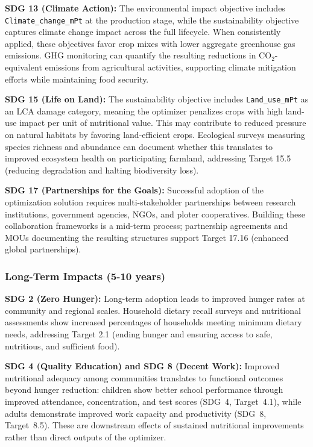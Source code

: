 \documentclass{oqireport}
\begin{document}
\textbf{SDG 13 (Climate Action):} The environmental impact objective includes \texttt{Climate\_change\_mPt} at the production stage, while the sustainability objective captures climate change impact across the full lifecycle. When consistently applied, these objectives favor crop mixes with lower aggregate greenhouse gas emissions. GHG monitoring can quantify the resulting reductions in CO$_2$-equivalent emissions from agricultural activities, supporting climate mitigation efforts while maintaining food security.

\textbf{SDG 15 (Life on Land):} The sustainability objective includes \texttt{Land\_use\_mPt} as an LCA damage category, meaning the optimizer penalizes crops with high land-use impact per unit of nutritional value. This may contribute to reduced pressure on natural habitats by favoring land-efficient crops. Ecological surveys measuring species richness and abundance can document whether this translates to improved ecosystem health on participating farmland, addressing Target 15.5 (reducing degradation and halting biodiversity loss).

\textbf{SDG 17 (Partnerships for the Goals):} Successful adoption of the optimization solution requires multi-stakeholder partnerships between research institutions, government agencies, NGOs, and ploter cooperatives. Building these collaboration frameworks is a mid-term process; partnership agreements and MOUs documenting the resulting structures support Target 17.16 (enhanced global partnerships).

\subsubsection{Long-Term Impacts (5-10 years)}

\textbf{SDG 2 (Zero Hunger):} Long-term adoption leads to improved hunger rates at community and regional scales. Household dietary recall surveys and nutritional assessments show increased percentages of households meeting minimum dietary needs, addressing Target 2.1 (ending hunger and ensuring access to safe, nutritious, and sufficient food).

\textbf{SDG 4 (Quality Education) and SDG 8 (Decent Work):} Improved nutritional adequacy among communities translates to functional outcomes beyond hunger reduction: children show better school performance through improved attendance, concentration, and test scores (SDG~4, Target~4.1), while adults demonstrate improved work capacity and productivity (SDG~8, Target~8.5). These are downstream effects of sustained nutritional improvements rather than direct outputs of the optimizer.
\end{document}
